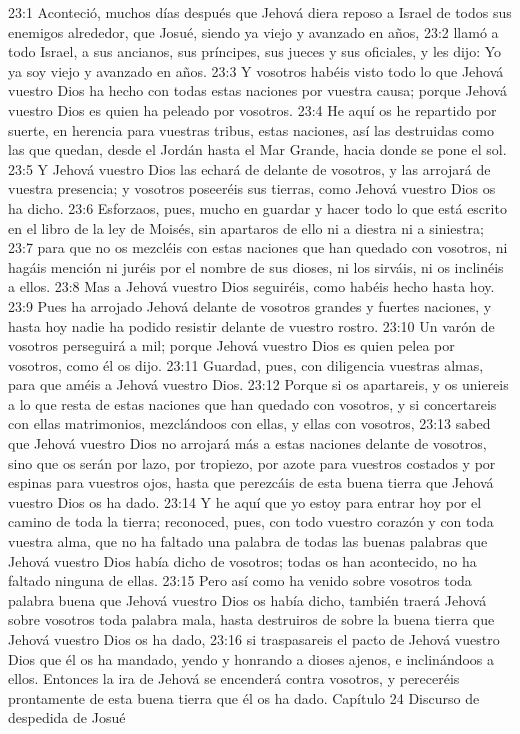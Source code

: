 23:1 Aconteció, muchos días después que Jehová diera reposo a Israel de todos sus enemigos alrededor, que Josué, siendo ya viejo y avanzado en años,  
23:2 llamó a todo Israel, a sus ancianos, sus príncipes, sus jueces y sus oficiales, y les dijo: Yo ya soy viejo y avanzado en años.  
23:3 Y vosotros habéis visto todo lo que Jehová vuestro Dios ha hecho con todas estas naciones por vuestra causa; porque Jehová vuestro Dios es quien ha peleado por vosotros.  
23:4 He aquí os he repartido por suerte, en herencia para vuestras tribus, estas naciones, así las destruidas como las que quedan, desde el Jordán hasta el Mar Grande, hacia donde se pone el sol.  
23:5 Y Jehová vuestro Dios las echará de delante de vosotros, y las arrojará de vuestra presencia; y vosotros poseeréis sus tierras, como Jehová vuestro Dios os ha dicho.  
23:6 Esforzaos, pues, mucho en guardar y hacer todo lo que está escrito en el libro de la ley de Moisés, sin apartaros de ello ni a diestra ni a siniestra;  
23:7 para que no os mezcléis con estas naciones que han quedado con vosotros, ni hagáis mención ni juréis por el nombre de sus dioses, ni los sirváis, ni os inclinéis a ellos.  
23:8 Mas a Jehová vuestro Dios seguiréis, como habéis hecho hasta hoy.  
23:9 Pues ha arrojado Jehová delante de vosotros grandes y fuertes naciones, y hasta hoy nadie ha podido resistir delante de vuestro rostro.  
23:10 Un varón de vosotros perseguirá a mil; porque Jehová vuestro Dios es quien pelea por vosotros, como él os dijo. 
23:11 Guardad, pues, con diligencia vuestras almas, para que améis a Jehová vuestro Dios.  
23:12 Porque si os apartareis, y os uniereis a lo que resta de estas naciones que han quedado con vosotros, y si concertareis con ellas matrimonios, mezclándoos con ellas, y ellas con vosotros,  
23:13 sabed que Jehová vuestro Dios no arrojará más a estas naciones delante de vosotros, sino que os serán por lazo, por tropiezo, por azote para vuestros costados y por espinas para vuestros ojos, hasta que perezcáis de esta buena tierra que Jehová vuestro Dios os ha dado.  
23:14 Y he aquí que yo estoy para entrar hoy por el camino de toda la tierra; reconoced, pues, con todo vuestro corazón y con toda vuestra alma, que no ha faltado una palabra de todas las buenas palabras que Jehová vuestro Dios había dicho de vosotros; todas os han acontecido, no ha faltado ninguna de ellas.  
23:15 Pero así como ha venido sobre vosotros toda palabra buena que Jehová vuestro Dios os había dicho, también traerá Jehová sobre vosotros toda palabra mala, hasta destruiros de sobre la buena tierra que Jehová vuestro Dios os ha dado,  
23:16 si traspasareis el pacto de Jehová vuestro Dios que él os ha mandado, yendo y honrando a dioses ajenos, e inclinándoos a ellos. Entonces la ira de Jehová se encenderá contra vosotros, y pereceréis prontamente de esta buena tierra que él os ha dado.  
Capítulo 24
Discurso de despedida de Josué  

